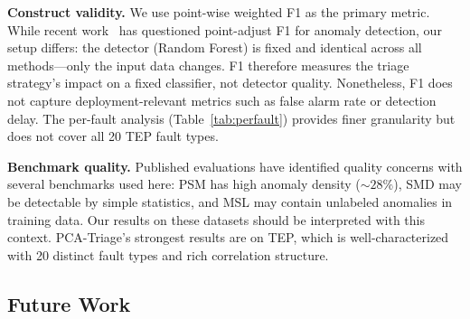 \documentclass[journal]{IEEEtran}
\begin{document}
\textbf{Construct validity.} We use point-wise weighted F1 as the primary metric. While recent work~\cite{processmonitoring2024survey} has questioned point-adjust F1 for anomaly detection, our setup differs: the detector (Random Forest) is fixed and identical across all methods---only the input data changes. F1 therefore measures the triage strategy's impact on a fixed classifier, not detector quality. Nonetheless, F1 does not capture deployment-relevant metrics such as false alarm rate or detection delay. The per-fault analysis (Table~\ref{tab:perfault}) provides finer granularity but does not cover all 20 TEP fault types.

\textbf{Benchmark quality.} Published evaluations have identified quality concerns with several benchmarks used here: PSM has high anomaly density (${\sim}28\%$), SMD may be detectable by simple statistics, and MSL may contain unlabeled anomalies in training data. Our results on these datasets should be interpreted with this context. PCA-Triage's strongest results are on TEP, which is well-characterized with 20 distinct fault types and rich correlation structure.

\subsection{Future Work}
\end{document}
